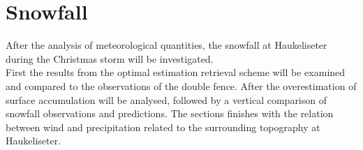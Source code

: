 \section{Snowfall}
After the analysis of meteorological quantities, the snowfall at Haukeliseter during the Christmas storm will be investigated.
\\
First the results from the optimal estimation retrieval scheme will be examined and compared to the observations of the double fence. After the overestimation of surface accumulation will be analysed, followed by a vertical comparison of snowfall observations and predictions. The sections finishes with the relation between wind and precipitation related to the surrounding topography at Haukeliseter. 
\newpage
